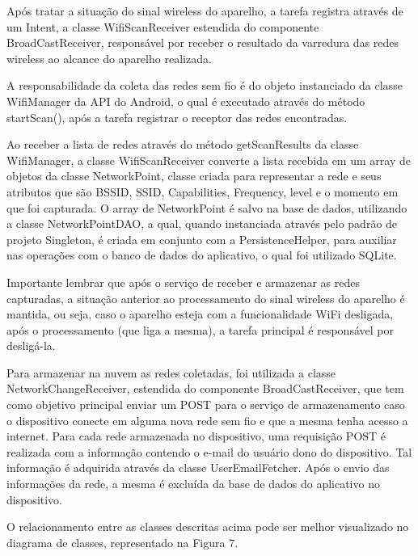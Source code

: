 \documentclass[12pt, %
openright, 
oneside,
a4paper,
brazil]{facom-ufu-abntex2}
\begin{document}
  Após tratar a situação do sinal wireless do aparelho, a tarefa registra através de um Intent, a classe WifiScanReceiver estendida do componente BroadCastReceiver, responsável por receber o resultado da varredura das redes wireless ao alcance do aparelho realizada.
 
 A responsabilidade da coleta das redes sem fio é do objeto instanciado da classe WifiManager da \ac{API} do Android, o qual é executado através do método startScan(), após a tarefa registrar o receptor das redes encontradas.
 
  Ao receber a lista de redes através do método getScanResults da classe WifiManager, a classe WifiScanReceiver converte a lista recebida em um array de objetos da classe NetworkPoint, classe criada para representar a rede e seus atributos que são \ac{BSSID}, \ac{SSID}, Capabilities, Frequency, level e o momento em que foi capturada. O array de NetworkPoint é salvo na base de dados, utilizando a classe NetworkPointDAO, a qual, quando instanciada através pelo  padrão de projeto Singleton, é criada em conjunto com a PersistenceHelper, para auxiliar nas operações com o banco de dados do aplicativo, o qual foi utilizado SQLite.
 
 Importante lembrar que após o serviço de receber e armazenar as redes capturadas, a situação anterior ao processamento do sinal wireless do aparelho é mantida, ou seja, caso o aparelho esteja com a funcionalidade \ac{WiFi} desligada, após o processamento (que liga a mesma), a tarefa principal é responsável por desligá-la. 
 
  Para armazenar na nuvem as redes coletadas, foi utilizada a classe NetworkChangeReceiver, estendida do componente BroadCastReceiver, que tem como objetivo principal enviar um POST para o serviço de armazenamento caso o dispositivo conecte em alguma nova rede sem fio e que a mesma tenha acesso a internet. Para cada rede armazenada no dispositivo, uma requisição POST é realizada com a informação contendo o e-mail do usuário dono do dispositivo. Tal informação é adquirida através da classe UserEmailFetcher.  Após o envio das informações da rede, a mesma é excluída da base de dados do aplicativo no dispositivo.

  O relacionamento entre as classes descritas acima pode ser melhor visualizado no diagrama de classes, representado na Figura 7.    
  
\end{document}
